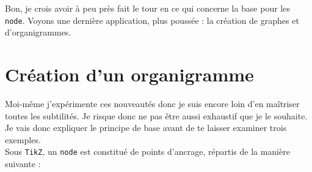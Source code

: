 
Bon, je crois avoir à peu près fait le tour en ce qui concerne la base pour les  \verb?node?. Voyons une dernière application, plus poussée : la création de graphes et d'organigrammes.

\section{Création d'un organigramme}

Moi-même j'expérimente ces nouveautés donc je suis encore loin d'en maîtriser toutes les subtilités. Je risque donc ne pas être aussi exhaustif que je le souhaite. Je vais donc expliquer le principe de base avant de te laisser examiner trois exemples. \\

Sous \texttt{TikZ}, un \verb?node? est constitué de points d'ancrage, répartis de la manière suivante :

